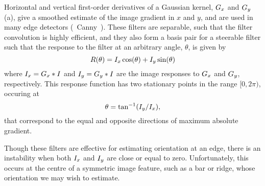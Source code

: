 \label{s:filtering_firstderivs}
%
%
%
Horizontal and vertical first-order derivatives of a Gaussian kernel, $G_x$ and $G_y$ (a), give a smoothed estimate of the image gradient in $x$ and $y$, and are used in many edge detectors (\eg~Canny~\cite{Canny_TPAMI86}). These filters are separable, such that the filter convolution is highly efficient, and they also form a basis pair for a steerable filter such that the response to the filter at an arbitrary angle, $\theta$, is given by
%
\begin{equation}
R(\theta) = I_x \cos(\theta) + I_y \sin(\theta)
\label{e:firstderivs_response}
\end{equation}
%
\noindent where $I_x=G_x\ast I$ and $I_y=G_y\ast I$ are the image responses to $G_x$ and $G_y$, respectively. This response function has two stationary points in the range $[0,2\pi)$, occuring at
%
\begin{equation}
\theta = \tan^{-1}(I_y/I_x),
\label{e:firstderivs_orientation}
\end{equation}
%
\noindent that correspond to the equal and opposite directions of maximum absolute gradient.

Though these filters are effective for estimating orientation at an edge, there is an instability when both $I_x$ and $I_y$ are close or equal to zero. Unfortunately, this occurs at the centre of a symmetric image feature, such as a bar or ridge, whose orientation we may wish to estimate.
